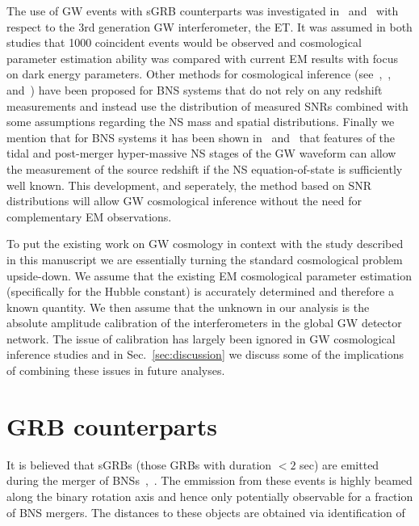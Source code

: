 \documentclass[10pt]{iopart}
\begin{document}
The use of \ac{GW} events with \ac{sGRB} counterparts was investigated
in~\cite{2010CQGra..27u5006S} and~\cite{2011PhRvD..83b3005Z} with respect to
the 3rd generation \ac{GW} interferometer, the \ac{ET}. It was
assumed in both studies that 1000 coincident events would be observed and
cosmological parameter estimation ability was compared with current \ac{EM}
results with focus on dark energy parameters. Other methods for cosmological
inference (see~\cite{1996PhRvD..53.2878F},~\cite{2012PhRvD..85b3535T},
and~\cite{2012PhRvD..86b3502T}) have been proposed for \ac{BNS} systems that do
not rely on any redshift measurements and instead use the distribution of
measured \acp{SNR} combined with some assumptions regarding the \ac{NS} mass
and spatial distributions. Finally we mention that for \ac{BNS} systems it has
been shown in~\cite{Messenger:2011ux} and~\cite{2013arXiv1312.1862M} that features
of the tidal and post-merger hyper-massive \ac{NS} stages of the \ac{GW}
waveform can allow the measurement of the source redshift if the \ac{NS}
equation-of-state is sufficiently well known. This development, and seperately, the method
based on \ac{SNR} distributions will allow \ac{GW} cosmological inference
without the need for complementary \ac{EM} observations.

To put the existing work on \ac{GW} cosmology in context with the study
described in this manuscript we are essentially turning the standard
cosmological problem upside-down. We assume that the existing \ac{EM}
cosmological parameter estimation (specifically for the Hubble constant) is
accurately determined and therefore a known quantity. We then assume that the
unknown in our analysis is the absolute amplitude calibration of the
interferometers in the global \ac{GW} detector network. The issue of
calibration has largely been ignored in \ac{GW} cosmological inference studies
and in Sec.~\ref{sec:discussion} we discuss some of the implications of
combining these issues in future analyses.     

\section{GRB counterparts\label{sec:GRB}}

It is believed that \acp{sGRB} (those \acp{GRB} with duration ${<}2$ sec) are
emitted during the merger of
\acp{BNS}~\cite{1989Natur.340..126E},~\cite{1992ApJ...395L..83N}. The emmission
from these events is highly beamed along the binary rotation axis and hence
only potentially observable for a fraction of \ac{BNS} mergers. The distances
to these objects are obtained via identification of 
\end{document}
